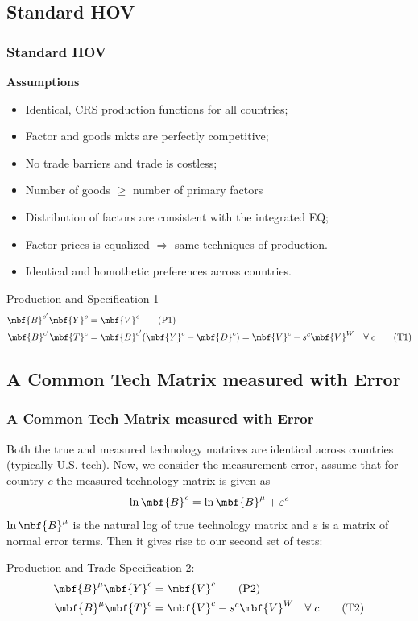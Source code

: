\documentclass[xcolor=svgnames,10pt]{beamer}
\begin{document}
\subsection{Standard HOV}
\begin{frame}[c]\frametitle{Standard HOV}
\textbf{Assumptions}
\begin{itemize}
    \item Identical, CRS production functions for all countries;
    \item Factor and goods mkts are perfectly competitive;
    \item No trade barriers and trade is costless;
    \item Number of goods $\geq$ number of primary factors
    \item Distribution of factors are consistent with the integrated EQ;
    \item Factor prices is equalized $\Rightarrow$ same techniques of production.
    \item Identical and homothetic preferences across countries.
\end{itemize}

\begin{block}{Production and Specification 1}
\begin{align}
\mbf{B}^{c^{\prime}} \mbf{Y}^{c} &= \mbf{V}^{c}\tag{P1}\\
\mbf{B}^{c^{\prime}} \mbf{T}^{c} &= \mbf{B}^{c^{\prime}}(\mbf{Y}^{c}-\mbf{D}^{c}) = \mbf{V}^{c} - s^{c} \mbf{V}^{W} \quad \forall\; c \tag{T1}
\end{align}
\end{block}
\end{frame}

\subsection{A Common Tech Matrix measured with Error}
\begin{frame}[c]\frametitle{A Common Tech Matrix measured with Error}
    Both the true and measured technology matrices are identical across countries (typically U.S. tech). Now, we consider the measurement error, assume that for country $c$ the measured technology matrix is given as
    \begin{equation}
    \ln \mbf{B}^{c}=\ln \mbf{B}^{\mu}+\varepsilon^{c}
    \end{equation}
    $\ln \mbf{B}^{\mu}$ is the natural log of true technology matrix and $\varepsilon$ is a matrix of normal error terms. Then it gives rise to our second set of tests:

\begin{block}{Production and Trade Specification 2:}
\begin{align}
\mbf{B}^{\mu} \mbf{Y}^{c} &= \mbf{V}^{c}\tag{P2}\\
\mbf{B}^{\mu} \mbf{T}^{c} &= \mbf{V}^{c} - s^{c}  \mbf{V}^{W} \quad \forall\; c  \tag{T2}
\end{align}
\end{block}

\end{frame}
\end{document}

